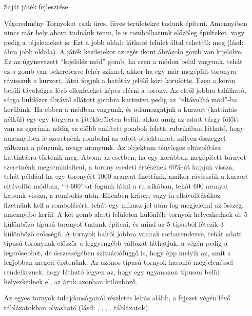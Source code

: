 \begin{MyChapter}{Saját játék fejlesztése}
\begin{MySection}{Végeredmény}
		Tornyokat csak üres, füves területekre tudunk építeni. Amennyiben nincs már hely ahova tudnánk tenni, le is rombolhatunk előzőleg épülteket, vagy pedig a tájelemeket is. Ezt a jobb oldalt látható felület által tehetjük meg (lásd:  ábra jobb oldala).		
		A játék kezdetekor az egér ikont ábrázoló gomb van kijelölve. Ez az úgynevezett ``kijelölés mód'' gomb, ha ezen a módon belül vagyunk, tehát ez a gomb van bekeretezve fehér színnel, akkor ha egy már megépült toronyra rávisszük a kurzort, látni fogjuk a hatótáv jelölő kört körülötte. Ezen a körön belüli távolságra lévő ellenfeleket képes elérni a torony. %
		Az ettől jobbra található, sárga buldózer ábrával ellátott gombra kattintva pedig az ``eltávolító mód''-ba kerülünk. Ha ebben a módban vagyunk, és odamozgatjuk a kurzort (kattintás nélkül) egy-egy tárgyra a játékfelületen belül, akkor amíg az adott tárgy fölött van az egerünk, addig az előbb említett gombok feletti rubrikában látható, hogy amennyiben le szeretnénk rombolni az adott objektumot, milyen összeggel változna a pénzünk, avagy aranyunk. Az objektum tényleges eltávolítása kattintásra történik meg.
		Abban az esetben, ha egy korábban megépített tornyot szeretnénk megsemmisíteni, a torony eredeti értékének 60\%-át kapjuk vissza, tehát például ha egy toronyért 1000 aranyat fizettünk, amikor rávisszük a kurzort eltávolító módban, ``+600''-at fogunk látni a rubrikában, tehát 600 aranyat kapunk vissza, a rombolás után. Ellenben kráter, vagy fa eltávolításához fizetnünk kell a rombolásért, tehát egy mínusz jel után fog megjelenni az összeg, amennyibe kerül.
		A két gomb alatti felületen különféle tornyok helyezkednek el, 5 különböző típusú toronyot tudunk építeni, és mind az 5 típusból létezik 3 különböző erősségű.
		A tornyok balról jobbra vannak sorbarendezve, tehát adott típusú toronynak először a leggyengébb változát láthatjuk, a végén pedig a legerősebbet, de összességében szituációfüggő is, hogy épp melyik az, amit a legjobban megéri építenünk. Az azonos típusú tornyok hasonló megjelenéssel rendelkeznek, hogy látható legyen az, hogy egy ugyanazon típuson belül helyezkednek el, az áruk azonban különböző.
		
		Az egyes tornyok tulajdonságairól részletes leírás alább, a fejezet végén lévő táblázatokban olvasható (lásd: , , , ,  táblázatok).
		

\end{MySection}
\end{MyChapter}
